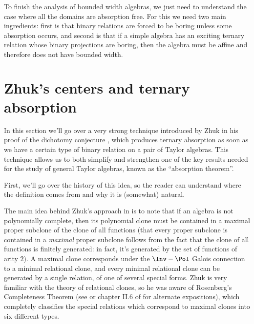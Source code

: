 
To finish the analysis of bounded width algebras, we just need to understand the case where all the domains are absorption free. For this we need two main ingredients: first is that binary relations are forced to be boring unless some absorption occurs, and second is that if a simple algebra has an exciting ternary relation whose binary projections are boring, then the algebra must be affine and therefore does not have bounded width.




\section{Zhuk's centers and ternary absorption}

In this section we'll go over a very strong technique introduced by Zhuk in his proof of the dichotomy conjecture \cite{zhuk-dichotomy}, which produces ternary absorption as soon as we have a certain type of binary relation on a pair of Taylor algebras. This technique allows us to both simplify and strengthen one of the key results needed for the study of general Taylor algebras, known as the ``absorption theorem''.

First, we'll go over the history of this idea, so the reader can understand where the definition comes from and why it is (somewhat) natural.

The main idea behind Zhuk's approach in \cite{zhuk-dichotomy} is to note that if an algebra is not polynomially complete, then its polynomial clone must be contained in a maximal proper subclone of the clone of all functions (that every proper subclone is contained in a \emph{maximal} proper subclone follows from the fact that the clone of all functions is finitely generated: in fact, it's generated by the set of functions of arity $2$). A maximal clone corresponds under the $\Inv-\Pol$ Galois connection to a minimal relational clone, and every minimal relational clone can be generated by a single relation, of one of several special forms. Zhuk is very familiar with the theory of relational clones, so he was aware of Rosenberg's Completeness Theorem \cite{rosenberg-completeness} (see \cite{pinsker-rosenberg} or chapter II.6 of \cite{lau-clone-theory} for alternate expositions), which completely classifies the special relations which correspond to maximal clones into six different types.

